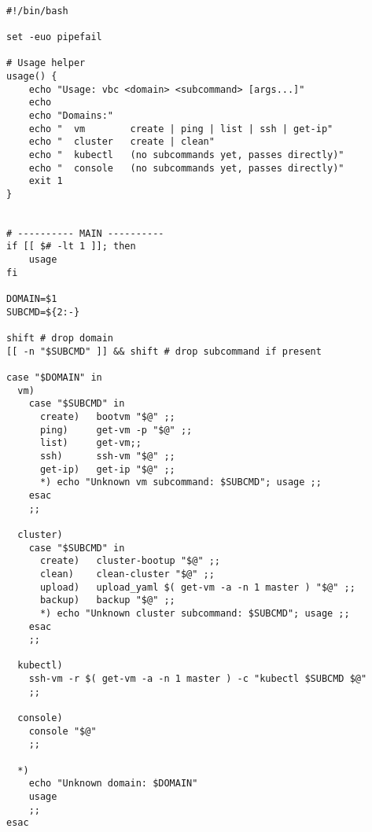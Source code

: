 \begin{verbatim}

#!/bin/bash

set -euo pipefail

# Usage helper
usage() {
    echo "Usage: vbc <domain> <subcommand> [args...]"
    echo
    echo "Domains:"
    echo "  vm        create | ping | list | ssh | get-ip"
    echo "  cluster   create | clean"
    echo "  kubectl   (no subcommands yet, passes directly)"
    echo "  console   (no subcommands yet, passes directly)"
    exit 1
}


# ---------- MAIN ----------
if [[ $# -lt 1 ]]; then
    usage
fi

DOMAIN=$1
SUBCMD=${2:-}

shift # drop domain
[[ -n "$SUBCMD" ]] && shift # drop subcommand if present

case "$DOMAIN" in
  vm)
    case "$SUBCMD" in
      create)   bootvm "$@" ;;
      ping)     get-vm -p "$@" ;;
      list)     get-vm;;
      ssh)      ssh-vm "$@" ;;
      get-ip)   get-ip "$@" ;;
      *) echo "Unknown vm subcommand: $SUBCMD"; usage ;;
    esac
    ;;

  cluster)
    case "$SUBCMD" in
      create)   cluster-bootup "$@" ;;
      clean)    clean-cluster "$@" ;;
      upload)   upload_yaml $( get-vm -a -n 1 master ) "$@" ;;
      backup)   backup "$@" ;;
      *) echo "Unknown cluster subcommand: $SUBCMD"; usage ;;
    esac
    ;;

  kubectl)
    ssh-vm -r $( get-vm -a -n 1 master ) -c "kubectl $SUBCMD $@"
    ;;

  console)
    console "$@"
    ;;

  *)
    echo "Unknown domain: $DOMAIN"
    usage
    ;;
esac
\end{verbatim}